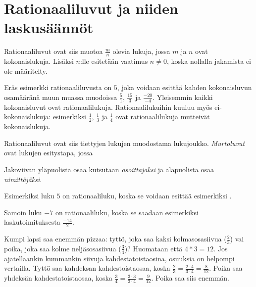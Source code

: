 \chapter{Rationaaliluvut ja niiden laskusäännöt}


Rationaaliluvut ovat siis muotoa $\frac{m}{n}$ olevia lukuja, jossa
$m$ ja $n$ ovat kokonaislukuja. Lisäksi $n$:lle esitetään vaatimus
$n \neq 0$, koska nollalla jakamista ei ole määritelty.

Eräs esimerkki rationaaliluvusta on $5$, joka voidaan esittää
kahden kokonaisluvun osamääränä muun muassa muodoissa $\frac{5}{1}$,
$\frac{15}{3}$ ja $\frac{-20}{-4}$. Yleisemmin kaikki kokonaisluvut
ovat rationaalilukuja. Rationaalilukuihin kuuluu myös ei-kokonaislukuja:
esimerkiksi $\frac{1}{2}$, $\frac{1}{3}$ ja $\frac{1}{4}$ ovat rationaalilukuja
mutteivät kokonaislukuja.

Rationaaliluvut ovat siis tiettyjen lukujen muodostama lukujoukko.
\emph{Murtoluvut} ovat lukujen esitystapa, jossa 

Jakoviivan yläpuolista osaa kutsutaan \emph{osoittajaksi} ja
alapuolista osaa \emph{nimittäjäksi}.

Esimerkiksi luku $5$ on rationaaliluku, koska se voidaan esittää
esimerkiksi .

Samoin luku $-7$ on rationaaliluku, koska se saadaan esimerkiksi laskutoimituksesta $\frac{-14}{2}$.


Kumpi lapsi saa enemmän pizzaa: tyttö, joka saa kaksi kolmasosasiivua ($ \frac{2}{3}$) vai poika, joka saa kolme neljäsosasiivua ($ \frac{3}{4}$)? Huomataan että $4*3=12$. Jos ajatellaankin kummankin siivuja kahdestatoistaosina, osuuksia on helpompi vertailla. Tyttö saa kahdeksan kahdestoistaosaa, koska $ \frac{2}{3} = \frac{2 \cdot 4}{3 \cdot 4} = \frac{8}{12}$. Poika saa yhdeksän kahdestatoistaosaa, koska $ \frac{3}{4} = \frac{3 \cdot 3}{3 \cdot 4} = \frac{9}{12}$. Poika saa siis enemmän.


